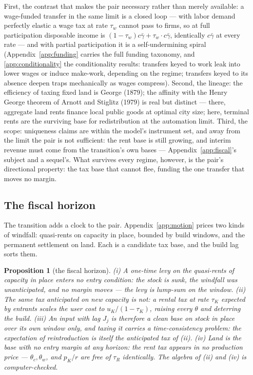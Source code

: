 \documentclass[12pt]{article}
\theoremstyle{plain}
\newtheorem{proposition}{Proposition}
\begin{document}
First, the contrast that makes the pair necessary rather than merely available: a wage-funded transfer in the same limit is a closed loop --- with labor demand perfectly elastic a wage tax at rate $\tau _w$ cannot pass to firms, so at full participation disposable income is $(1-\tau _w)c\bar{\gamma} + \tau _w\cdot c\bar{\gamma}$, identically $c\bar{\gamma}$ at every rate --- and with partial participation it is a self-undermining spiral (Appendix~\ref{app:funding} carries the full funding taxonomy, and \ref{app:conditionality} the conditionality results: transfers keyed to work leak into lower wages or induce make-work, depending on the regime; transfers keyed to its absence deepen traps mechanically as wages compress). Second, the lineage: the efficiency of taxing fixed land is George (1879); the affinity with the Henry George theorem of Arnott and Stiglitz (1979) is real but distinct --- there, aggregate land rents finance local public goods at optimal city size; here, terminal rents are the surviving base for redistribution at the automation limit. Third, the scope: uniqueness claims are within the model's instrument set, and away from the limit the pair is not sufficient: the rent base is still growing, and interim revenue must come from the transition's own bases --- Appendix~\ref{app:fiscal}'s subject and a sequel's. What survives every regime, however, is the pair's directional property: the tax base that cannot flee, funding the one transfer that moves no margin.

\subsection{The fiscal horizon}\label{sec:fiscal-horizon}

The transition adds a clock to the pair. Appendix~\ref{app:motion} prices two kinds of windfall: quasi-rents on capacity in place, bounded by build windows, and the permanent settlement on land. Each is a candidate tax base, and the build lag sorts them.

\begin{proposition}[the fiscal horizon]\label{prop:horizon}
(i) A one-time levy on the quasi-rents of capacity in place enters no entry condition: the stock is sunk, the windfall was unanticipated, and no margin moves --- the levy is lump-sum on the window. (ii) The same tax anticipated on new capacity is not: a rental tax at rate $\tau _K$ expected by entrants scales the user cost to $u_K/(1-\tau _K)$, raising every $\theta$ and deterring the build. (iii) An input with lag $J_j$ is therefore a clean base on stock in place over its own window only, and taxing it carries a time-consistency problem: the expectation of reintroduction is itself the anticipated tax of (ii). (iv) Land is the base with no entry margin at any horizon: the rent tax appears in no production price --- $\theta _c, \theta _w$, and $p_K/r$ are free of $\tau _R$ identically. The algebra of (ii) and (iv) is computer-checked.
\end{proposition}
\end{document}
